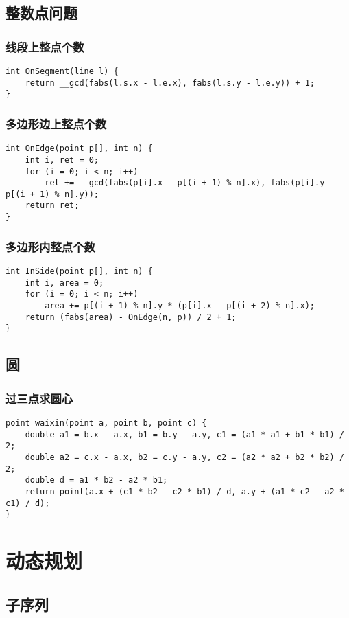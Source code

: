 \documentclass[a4paper]{article}
\begin{document}
\subsection{整数点问题}
\subsubsection{线段上整点个数}
\begin{lstlisting}
int OnSegment(line l) {
	return __gcd(fabs(l.s.x - l.e.x), fabs(l.s.y - l.e.y)) + 1;
}
\end{lstlisting}
\subsubsection{多边形边上整点个数}
\begin{lstlisting}
int OnEdge(point p[], int n) {
	int i, ret = 0;
	for (i = 0; i < n; i++)
		ret += __gcd(fabs(p[i].x - p[(i + 1) % n].x), fabs(p[i].y - p[(i + 1) % n].y));
	return ret;
}
\end{lstlisting}
\subsubsection{多边形内整点个数}
\begin{lstlisting}
int InSide(point p[], int n) {
	int i, area = 0;
	for (i = 0; i < n; i++) 
		area += p[(i + 1) % n].y * (p[i].x - p[(i + 2) % n].x);	
	return (fabs(area) - OnEdge(n, p)) / 2 + 1;
}
\end{lstlisting}
\subsection{圆}
\subsubsection{过三点求圆心}
\begin{lstlisting}
point waixin(point a, point b, point c) {
	double a1 = b.x - a.x, b1 = b.y - a.y, c1 = (a1 * a1 + b1 * b1) / 2;
	double a2 = c.x - a.x, b2 = c.y - a.y, c2 = (a2 * a2 + b2 * b2) / 2;
	double d = a1 * b2 - a2 * b1;
	return point(a.x + (c1 * b2 - c2 * b1) / d, a.y + (a1 * c2 - a2 * c1) / d);
}
\end{lstlisting}
\clearpage
\section{动态规划}
\subsection{子序列}
\end{document}
